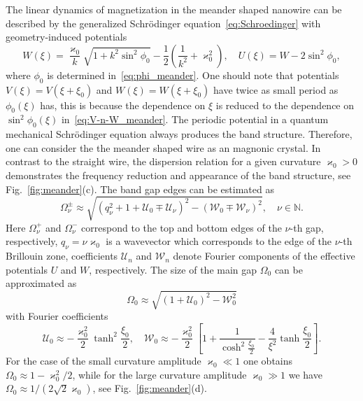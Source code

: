 The linear dynamics of magnetization in the meander shaped nanowire can be described by the generalized Schr\"odinger equation~\eqref{eq:Schroedinger} with geometry-induced potentials
\begin{equation} \label{eq:V-n-W_meander}
W(\xi) = \frac{\varkappa_0}{k}\sqrt{1+k^2\sin^2\phi_0}-\frac{1}{2}\left(\frac{1}{k^2}+\varkappa^2_0\right),\quad U(\xi) = W-2\sin^2\phi_0,
\end{equation}
where $\phi_0$ is determined in~\eqref{eq:phi_meander}. One should note that potentials $V(\xi)=V(\xi+\xi_0)$ and $W(\xi)=W(\xi+\xi_0)$ have twice as small period as $\phi_0(\xi)$ has, this is because the dependence on $\xi$ is reduced to the dependence on $\sin^2\phi_0(\xi)$ in~\eqref{eq:V-n-W_meander}. The periodic potential in a quantum mechanical Schr\"odinger equation always produces the band structure. Therefore, one can consider the the meander shaped wire as an magnonic crystal. In contrast to the straight wire, the dispersion relation for a given curvature $\varkappa_0>0$ demonstrates the frequency reduction and appearance of the band structure, see Fig.~\ref{fig:meander}(c). The band gap edges can be estimated as~\cite{Korniienko19b}
\begin{equation}
\Omega^{\pm}_\nu\approx\sqrt{\left(q^2_\nu+1+\mathcal{U}_0\mp \mathcal{U}_\nu\right)^2-\left(\mathcal{W}_0\mp \mathcal{W}_\nu\right)^2}, \quad \nu\in\mathbb{N}.
\end{equation}
Here $\Omega^{+}_\nu$ and $\Omega^{-}_\nu$ correspond to the top and bottom edges of the $\nu$-th gap, respectively, $q_\nu = \nu\varkappa_0$ is a wavevector which corresponds to the edge of the $\nu$-th Brillouin zone, coefficients $\mathcal{U}_n$ and $\mathcal{W}_n$ denote Fourier components of the effective potentials $U$ and $W$, respectively. The size of the main gap $\Omega_0$ can be approximated as~\cite{Korniienko19b}
\begin{equation}\label{eq:band_gaps_meander}
\Omega_0\approx\sqrt{\left(1+\mathcal{U}_0\right)^2-\mathcal{W}_0^2}
\end{equation}
with Fourier coefficients
\begin{equation}
	\mathcal{U}_0 \approx -\frac{\varkappa_0^2}{2}\tanh^2\frac{\xi_0}{2}, \quad \mathcal{W}_0 \approx -\frac{\varkappa_0^2}{2}\left[1+\frac{1}{\cosh^2\frac{\xi_0}{2}} - \frac{4}{\xi^2}\tanh\frac{\xi_0}{2}\right].
\end{equation}
For the case of the small curvature amplitude $\varkappa_0\ll 1$ one obtains $\Omega_0\approx1 - \varkappa_0^2/2$, while for the large curvature amplitude $\varkappa_0\gg1$ we have $\Omega_0\approx 1/\left(2\sqrt{2}\varkappa_0\right)$, see Fig.~\ref{fig:meander}(d).